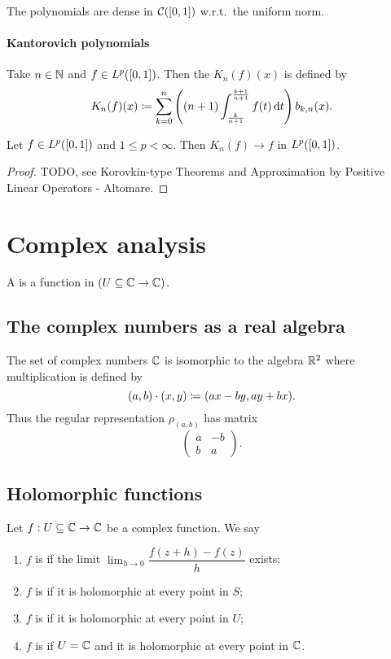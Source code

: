 \begin{corollary}
The polynomials are dense in $\cont(\interval{0,1})$ w.r.t.\ the uniform norm.
\end{corollary}

\subsubsection{Kantorovich polynomials}
\begin{definition}
Take $n\in \mathbb{N}$ and $f\in L^p(\interval{0,1})$. Then the  $K_n(f)(x)$ is defined by
\[ K_n(f)(x) \coloneqq \sum_{k=0}^n\left((n+1)\int_{\frac{k}{n+1}}^{\frac{k+1}{n+1}}f(t)\operatorname{d \!}{t}\right)b_{k,n}(x). \]
\end{definition}

\begin{proposition}
Let $f\in L^p(\interval{0,1})$ and $1\leq p <\infty$. Then $K_n(f) \to f$ in $L^p(\interval{0,1})$.
\end{proposition}
\begin{proof}
TODO, see Korovkin-type Theorems and Approximation by Positive Linear Operators - Altomare.
\end{proof}

\chapter{Complex analysis}
\begin{definition}
A  is a function in $(U\subseteq \mathbb{C} \to \mathbb{C})$.
\end{definition}
\section{The complex numbers as a real algebra}
The set of complex numbers $\mathbb{C}$ is isomorphic to the algebra $\mathbb{R}^2$ where multiplication is defined by
\[ (a, b)\cdot (x, y) \coloneqq (ax-by, ay+bx). \]
Thus the regular representation $\rho_{(a,b)}$ has matrix
\[ \begin{pmatrix}
a & -b \\ b & a
\end{pmatrix}. \]

\section{Holomorphic functions}
\begin{definition}
Let $f:U\subseteq \mathbb{C} \to \mathbb{C}$ be a complex function. We say
\begin{enumerate}
\item $f$ is  if the limit $\lim_{h\to 0} \dfrac{f(z+h) - f(z)}{h}$
exists;
\item $f$ is  if it is holomorphic at every point in $S$;
\item $f$ is  if it is holomorphic at every point in $U$;
\item $f$ is  if $U=\mathbb{C}$ and it is holomorphic at every point in $\mathbb{C}$.
\end{enumerate}
\end{definition}

